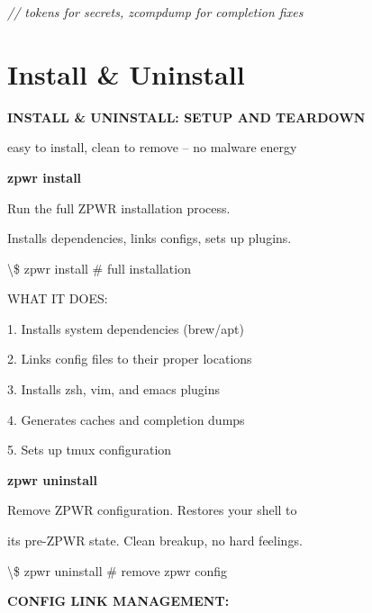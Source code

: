 \documentclass[11pt,a4paper,twoside]{book}
\begin{document}
{\small\itshape\color{dimtext} // tokens for secrets, zcompdump for completion fixes}


\vspace{16pt}

\section{Install \& Uninstall}


\vspace{10pt}
{\large\bfseries\color{neoncyan} INSTALL \& UNINSTALL: SETUP AND TEARDOWN}\vspace{6pt}

easy to install, clean to remove -- no malware energy


\vspace{12pt}
{\bfseries\color{neonyellow} zpwr install}\vspace{4pt}

Run the full ZPWR installation process.

Installs dependencies, links configs, sets up plugins.

\begin{codebox}
\textbackslash{}\$ zpwr install                \# full installation\\
\end{codebox}

WHAT IT DOES:

1. Installs system dependencies (brew/apt)

2. Links config files to their proper locations

3. Installs zsh, vim, and emacs plugins

4. Generates caches and completion dumps

5. Sets up tmux configuration


\vspace{12pt}
{\bfseries\color{neonyellow} zpwr uninstall}\vspace{4pt}

Remove ZPWR configuration. Restores your shell to

its pre-ZPWR state. Clean breakup, no hard feelings.

\begin{codebox}
\textbackslash{}\$ zpwr uninstall              \# remove zpwr config\\
\end{codebox}


\vspace{12pt}
{\bfseries\color{neonyellow} CONFIG LINK MANAGEMENT:}\vspace{4pt}
\end{document}
